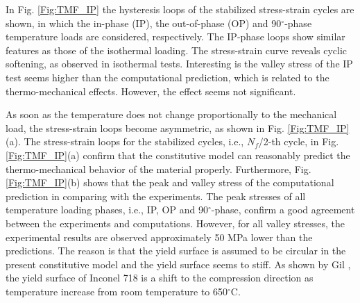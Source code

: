 \documentclass[preprint,5p,twocolumn,11pt,sort&compress]{elsarticle}
\newcommand{\marked}[1]{\textcolor{red}{#1}}
\begin{document}
In Fig. \ref{Fig:TMF_IP} the hysteresis loops of the stabilized stress-strain cycles are shown, in which the in-phase (IP), the out-of-phase (OP) and 90$^\circ$-phase temperature loads are considered, respectively.
The IP-phase loops show similar features as those of the isothermal loading.
The stress-strain curve reveals cyclic softening, as observed in isothermal tests. Interesting is the valley stress of the IP test seems higher than the computational prediction, which is related to the thermo-mechanical effects. However, the effect seems not significant.

As soon as the temperature does not change proportionally to the mechanical load, the stress-strain loops become asymmetric, as shown in Fig. \ref{Fig:TMF_IP}(a).
The stress-strain loops for the stabilized cycles, i.e., $N_f$/2-th cycle, in Fig. \ref{Fig:TMF_IP}(a) confirm that the constitutive model can reasonably predict the thermo-mechanical behavior of the material properly.
Furthermore, Fig. \ref{Fig:TMF_IP}(b) shows that the peak and valley stress of the computational prediction in comparing with the experiments.
The peak stresses of all temperature loading phases, i.e., IP, OP and 90$^\circ$-phase, confirm a good agreement between the experiments and computations.
However, for all valley stresses, the experimental results are observed approximately 50 MPa lower than the predictions.
The reason is that the yield surface is assumed to be circular in the present constitutive model and the yield surface seems to stiff.
As shown by Gil \cite{Gil1998}, the yield surface of Inconel 718 is a shift to the compression direction as temperature increase from room temperature to 650$^{\circ}$C.


\end{document}
